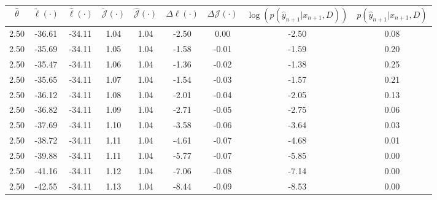 \begin{table}[htbp]
        \centering
        \tiny
        \begin{adjustbox}{angle=90}
            \begin{tabular}{|c|c|c|c|c|c|c|c|c|}
                \hline
                 $\hat{\theta}$ & $\tilde{\ell}(\cdot)$ & $\hat{\ell}(\cdot)$ & $\tilde{\mathcal{J}}(\cdot)$ & $\hat{\mathcal{J}}(\cdot)$ & $\Delta \ell(\cdot)$ & $\Delta \mathcal{J}(\cdot)$ & $\log(p(\hat{y}_{n+1}|x_{n+1}, D))$ & $p(\hat{y}_{n+1}|x_{n+1}, D)$ \\
                \hline
                 2.50 & -36.61 & -34.11 & 1.04 & 1.04 & -2.50 & 0.00 & -2.50 & 0.08\\ \hline
 2.50 & -35.69 & -34.11 & 1.05 & 1.04 & -1.58 & -0.01 & -1.59 & 0.20\\ \hline
 2.50 & -35.47 & -34.11 & 1.06 & 1.04 & -1.36 & -0.02 & -1.38 & 0.25\\ \hline
 2.50 & -35.65 & -34.11 & 1.07 & 1.04 & -1.54 & -0.03 & -1.57 & 0.21\\ \hline
 2.50 & -36.12 & -34.11 & 1.08 & 1.04 & -2.01 & -0.04 & -2.05 & 0.13\\ \hline
 2.50 & -36.82 & -34.11 & 1.09 & 1.04 & -2.71 & -0.05 & -2.75 & 0.06\\ \hline
 2.50 & -37.69 & -34.11 & 1.10 & 1.04 & -3.58 & -0.06 & -3.64 & 0.03\\ \hline
 2.50 & -38.72 & -34.11 & 1.11 & 1.04 & -4.61 & -0.07 & -4.68 & 0.01\\ \hline
 2.50 & -39.88 & -34.11 & 1.11 & 1.04 & -5.77 & -0.07 & -5.85 & 0.00\\ \hline
 2.50 & -41.16 & -34.11 & 1.12 & 1.04 & -7.06 & -0.08 & -7.14 & 0.00\\ \hline
 2.50 & -42.55 & -34.11 & 1.13 & 1.04 & -8.44 & -0.09 & -8.53 & 0.00\\ \hline
            \end{tabular}
        \end{adjustbox}
        \caption{}
        \label{}
    \end{table}
    